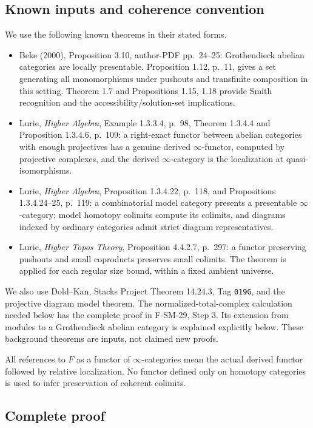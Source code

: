 \subsection{Known inputs and coherence convention}
We use the following known theorems in their stated forms.
\begin{itemize}
\item Beke (2000), Proposition 3.10, author-PDF pp.~24--25:
Grothendieck abelian categories are locally presentable.
Proposition 1.12, p.~11, gives a set generating all monomorphisms
under pushouts and transfinite composition in this setting.
Theorem 1.7 and Propositions 1.15, 1.18 provide Smith recognition
and the accessibility/solution-set implications.
\item Lurie, \emph{Higher Algebra}, Example 1.3.3.4, p.~98,
Theorem 1.3.4.4 and Proposition 1.3.4.6, p.~109:
a right-exact functor between
abelian categories with enough projectives has a genuine derived
\(\infty\)-functor, computed by projective complexes, and the
derived \(\infty\)-category is the localization at quasi-isomorphisms.
\item Lurie, \emph{Higher Algebra}, Proposition 1.3.4.22,
p.~118, and Propositions 1.3.4.24--25, p.~119: a combinatorial
model category presents a presentable \(\infty\)-category;
model homotopy colimits compute its colimits, and diagrams
indexed by ordinary categories admit strict diagram representatives.
\item Lurie, \emph{Higher Topos Theory}, Proposition 4.4.2.7,
p.~297: a functor preserving pushouts and small coproducts
preserves small colimits.  The theorem is applied for each
regular size bound, within a fixed ambient universe.
\end{itemize}
We also use Dold--Kan, Stacks Project Theorem 14.24.3,
Tag \texttt{019G}, and the projective diagram model theorem.
The normalized-total-complex calculation needed below has the
complete proof in F-SM-29, Step 3.  Its extension from modules to
a Grothendieck abelian category is explained explicitly below.
These background theorems are inputs, not claimed new proofs.

All references to \(F\) as a functor of \(\infty\)-categories
mean the actual derived functor followed by relative localization.
No functor defined only on homotopy categories is used to infer
preservation of coherent colimits.

\subsection{Complete proof}

